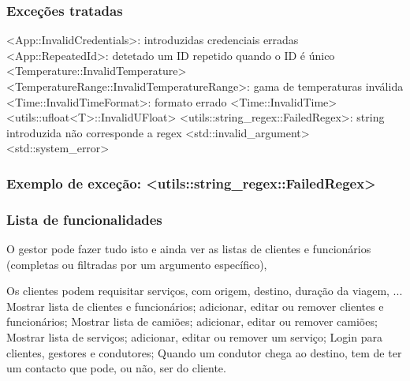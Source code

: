 \documentclass{beamer}
\def\\{}
\def\texttt#1{<#1>}
\begin{document}
\begin{frame}
\frametitle{Exceções tratadas}
\texttt{App::InvalidCredentials}: introduzidas credenciais erradas\\
\texttt{App::RepeatedId}: detetado um ID repetido quando o ID é único\\
\texttt{Temperature::InvalidTemperature}\\
\texttt{TemperatureRange::InvalidTemperatureRange}: gama de temperaturas inválida\\
\texttt{Time::InvalidTimeFormat}: formato errado\\
\texttt{Time::InvalidTime}\\
\texttt{utils::ufloat<T>::InvalidUFloat}\\
\texttt{utils::string\_regex::FailedRegex}: string introduzida não corresponde a regex\\
\texttt{std::invalid\_argument}\\
\texttt{std::system\_error} 
\end{frame}

\begin{frame}
\frametitle{Exemplo de exceção: \texttt{utils::string\_regex::FailedRegex}}
\begin{center} \begin{minipage}{0.95\linewidth}


\end{minipage} \end{center}
\end{frame}

\begin{frame}
\frametitle{Lista de funcionalidades} 
O gestor pode fazer tudo isto e ainda ver as listas de clientes e funcionários (completas ou filtradas por um argumento específico),



Os clientes podem requisitar serviços, com origem, destino, duração da viagem, ...\\
Mostrar lista de clientes e funcionários; adicionar, editar ou remover clientes e funcionários;\\
Mostrar lista de camiões; adicionar, editar ou remover camiões; \\
Mostrar lista de serviços; adicionar, editar ou remover um serviço;\\
Login para clientes, gestores e condutores;\\
Quando um condutor chega ao destino, tem de ter um contacto que pode, ou não, ser do cliente.\\

\end{frame}
\end{document}
